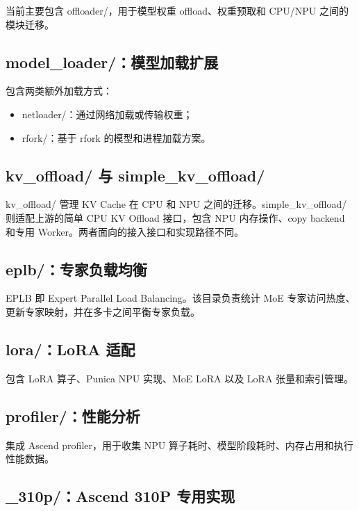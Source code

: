 \documentclass[UTF8,11pt,a4paper]{ctexart}
\DeclareRobustCommand{\folder}[1]{\texttt{\detokenize{#1}}}
\def\folder#1{#1}%
\begin{document}
当前主要包含 \folder{offloader/}，用于模型权重 offload、权重预取和 CPU/NPU 之间的模块迁移。

\subsection{\folder{model_loader/}：模型加载扩展}

包含两类额外加载方式：

\begin{itemize}
  \item \folder{netloader/}：通过网络加载或传输权重；
  \item \folder{rfork/}：基于 rfork 的模型和进程加载方案。
\end{itemize}

\subsection{\folder{kv_offload/} 与 \folder{simple_kv_offload/}}

\folder{kv_offload/} 管理 KV Cache 在 CPU 和 NPU 之间的迁移。\folder{simple_kv_offload/} 则适配上游的简单 CPU KV Offload 接口，包含 NPU 内存操作、copy backend 和专用 Worker。两者面向的接入接口和实现路径不同。

\subsection{\folder{eplb/}：专家负载均衡}

EPLB 即 Expert Parallel Load Balancing。该目录负责统计 MoE 专家访问热度、更新专家映射，并在多卡之间平衡专家负载。

\subsection{\folder{lora/}：LoRA 适配}

包含 LoRA 算子、Punica NPU 实现、MoE LoRA 以及 LoRA 张量和索引管理。

\subsection{\folder{profiler/}：性能分析}

集成 Ascend profiler，用于收集 NPU 算子耗时、模型阶段耗时、内存占用和执行性能数据。

\subsection{\folder{_310p/}：Ascend 310P 专用实现}
\end{document}
